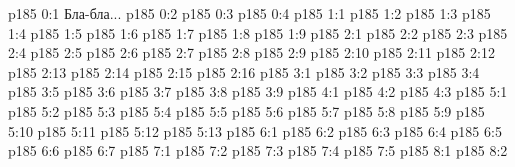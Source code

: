 \author{Промежуточные создания}
\vs p185 0:1  Бла-бла...
\vs p185 0:2 
\vs p185 0:3 
\vs p185 0:4 
\vs p185 1:1 
\vs p185 1:2 
\vs p185 1:3 
\vs p185 1:4 
\vs p185 1:5 \pc 
\vs p185 1:6 \pc 
\vs p185 1:7 \pc 
\vs p185 1:8 \pc 
\vs p185 1:9 
\vs p185 2:1 
\vs p185 2:2 
\vs p185 2:3 
\vs p185 2:4 
\vs p185 2:5 
\vs p185 2:6 \pc 
\vs p185 2:7 \pc 
\vs p185 2:8 
\vs p185 2:9 
\vs p185 2:10 \pc 
\vs p185 2:11 
\vs p185 2:12 
\vs p185 2:13 
\vs p185 2:14 \pc 
\vs p185 2:15 
\vs p185 2:16 
\vs p185 3:1 
\vs p185 3:2 
\vs p185 3:3 
\vs p185 3:4 
\vs p185 3:5 
\vs p185 3:6 
\vs p185 3:7 
\vs p185 3:8 
\vs p185 3:9 
\vs p185 4:1 
\vs p185 4:2 
\vs p185 4:3 
\vs p185 5:1 
\vs p185 5:2 
\vs p185 5:3 
\vs p185 5:4 
\vs p185 5:5 
\vs p185 5:6 
\vs p185 5:7 
\vs p185 5:8 
\vs p185 5:9 
\vs p185 5:10 
\vs p185 5:11 
\vs p185 5:12 
\vs p185 5:13 
\vs p185 6:1 
\vs p185 6:2 
\vs p185 6:3 
\vs p185 6:4 
\vs p185 6:5 
\vs p185 6:6 
\vs p185 6:7 
\vs p185 7:1 
\vs p185 7:2 
\vs p185 7:3 
\vs p185 7:4 
\vs p185 7:5 
\vs p185 8:1 
\vs p185 8:2 \pc 
\quizlink
